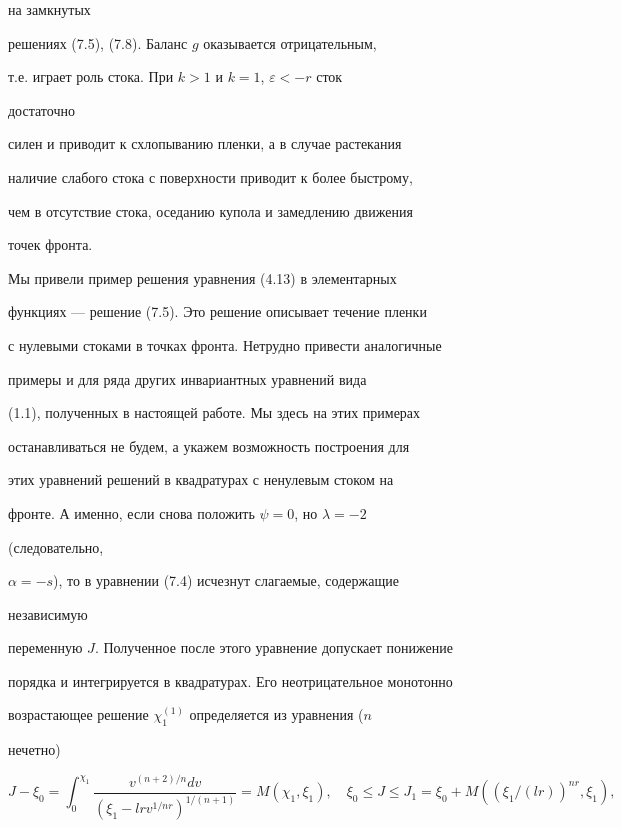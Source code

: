 на замкнутых


решениях (7.5), (7.8). Баланс $g$  оказывается отрицательным,


т.е. играет роль стока. При $k>1$ и $k=1$, $\varepsilon<-r$ сток


достаточно


силен и приводит  к  схлопыванию  пленки, а в случае растекания


наличие слабого стока с поверхности приводит к  более быстрому,


чем в отсутствие стока, оседанию купола и  замедлению  движения


точек фронта.





Мы привели пример решения уравнения (4.13) в  элементарных


функциях --- решение (7.5).  Это решение описывает течение пленки


с нулевыми стоками в точках фронта. Нетрудно привести аналогичные


примеры  и  для  ряда  других  инвариантных  уравнений вида


(1.1), полученных в настоящей работе. Мы здесь на этих примерах


останавливаться не  будем,  а укажем возможность построения для


этих уравнений решений в  квадратурах  с  ненулевым  стоком  на


фронте. А именно, если снова положить $\psi=0$, но $\lambda=-2$


(следовательно,


$\alpha=-s$), то в уравнении (7.4) исчезнут слагаемые, содержащие


независимую


переменную $J$. Полученное после этого уравнение  допускает понижение


порядка и интегрируется в  квадратурах. Его неотрицательное монотонно


возрастающее решение $\chi^{(1)}_1$ определяется из уравнения ($n$


нечетно)


$$


J-\xi_0=\int^{\chi_1}_0


\frac{v^{(n+2)/n}dv}{(\xi_1-lrv^{1/nr})^{1/(n+1)}}=


M(\chi_1,\xi_1),\quad \xi_0\le J\le J_1=\xi_0+


M((\xi_1/(lr))^{nr},\xi_1),


$$


